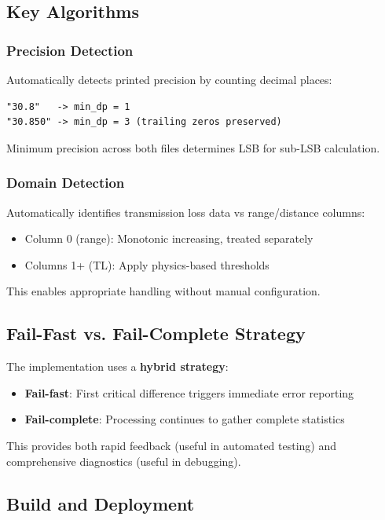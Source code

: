 \documentclass[11pt,letterpaper]{article}
\begin{document}
\subsection{Key Algorithms}

\subsubsection{Precision Detection}

Automatically detects printed precision by counting decimal places:
\begin{verbatim}
"30.8"   -> min_dp = 1
"30.850" -> min_dp = 3 (trailing zeros preserved)
\end{verbatim}

Minimum precision across both files determines LSB for sub-LSB calculation.

\subsubsection{Domain Detection}

Automatically identifies transmission loss data vs range/distance columns:
\begin{itemize}
    \item Column 0 (range): Monotonic increasing, treated separately
    \item Columns 1+ (TL): Apply physics-based thresholds
\end{itemize}

This enables appropriate handling without manual configuration.

\subsection{Fail-Fast vs. Fail-Complete Strategy}

The implementation uses a \textbf{hybrid strategy}:

\begin{itemize}
    \item \textbf{Fail-fast}: First critical difference triggers immediate error reporting
    \item \textbf{Fail-complete}: Processing continues to gather complete statistics
\end{itemize}

This provides both rapid feedback (useful in automated testing) and comprehensive diagnostics (useful in debugging).

\subsection{Build and Deployment}
\end{document}
